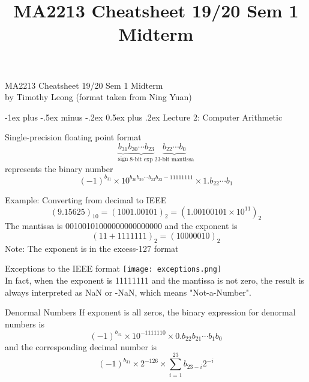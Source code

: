 \documentclass[10pt,landscape]{article}
\title{MA2213 Cheatsheet 19/20 Sem 1 Midterm}
\makeatletter
\renewcommand{\section}{\@startsection{section}{1}{0mm}%
                                {-1ex plus -.5ex minus -.2ex}%
                                {0.5ex plus .2ex}%
                                {\normalfont\large\bfseries}}
\theoremstyle{definition}
\newcommand{\thistheoremname}{}
\newtheorem*{genericthm*}{\thistheoremname}
\newenvironment{namedthm*}[1]
{\renewcommand{\thistheoremname}{#1}\begin{genericthm*}}
{\end{genericthm*}}
\makeatother
\begin{document}
\begin{center}
{\large MA2213 Cheatsheet 19/20 Sem 1 Midterm}\\{by Timothy Leong (format taken from Ning Yuan)}
\end{center}

\raggedright
\footnotesize

\begin{multicols}{3}

\setlength{\premulticols}{1pt}
\setlength{\postmulticols}{1pt}
\setlength{\multicolsep}{1pt}
\setlength{\columnsep}{2pt}

\section{Lecture 2: Computer Arithmetic}

\begin{namedthm*}{Single-precision floating point format}
$$\underbrace{b_{31}}_\text{sign}\underbrace{b_{30}\cdots b_{23}}_\text{8-bit exp}\underbrace{b_{22}\cdots b_{0}}_\text{23-bit mantissa}$$ represents the binary number $$(-1)^{b_{31}} \times 10^{b_{30} b_{29} \cdots b_{23} b_{23}-11111111} \times 1 . b_{22} \cdots b_{1}$$
\end{namedthm*}

\begin{namedthm*}{Example: Converting from decimal to IEEE}
$$(9.15625)_{10}=(1001.00101)_{2}=\left(1.00100101 \times 10^{11}\right)_{2}$$
The mantissa is 00100101000000000000000 and the exponent is
$$
(11+1111111)_{2}=(10000010)_{2}
$$
Note: The exponent is in the excess-127 format
\end{namedthm*}



\begin{namedthm*}{Exceptions to the IEEE format}
\texttt{[image: exceptions.png]}
\\In fact, when the exponent is 11111111 and the mantissa is not zero, the result is always
interpreted as NaN or -NaN, which means "Not-a-Number".
\end{namedthm*}


\begin{namedthm*}{Denormal Numbers}
If exponent is all zeros, the binary expression for denormal numbers is 
$$(-1)^{b_{31}} \times 10^{-1111110} \times 0 . b_{22} b_{21} \cdots b_{1} b_{0}$$
and the corresponding decimal number is $$(-1)^{b_{31}} \times 2^{-126} \times \sum_{i=1}^{23} b_{23-i} 2^{-i}$$
\end{namedthm*}



\end{multicols}
\end{document}
